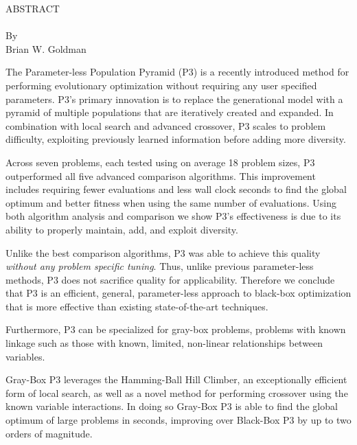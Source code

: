 \thispagestyle{empty} \setcounter{page}{2}
\begin{doublespace}
\begin{centering}
ABSTRACT\\ %
\MyTitle\\ %
By \\ %
Brian W. Goldman\\ %
\end{centering}

The Parameter-less Population Pyramid (P3) is a recently introduced method for performing
evolutionary optimization without requiring any user specified parameters.
P3's primary innovation is to replace the generational model with a pyramid of
multiple populations that are iteratively created and expanded. In combination
with local search and advanced crossover, %
P3 scales to problem difficulty, exploiting
previously learned information before adding more diversity.

Across seven problems, each tested using on average 18 problem sizes, P3 outperformed
all five advanced comparison algorithms. This improvement includes
requiring 
fewer evaluations
and less wall clock seconds to find the global optimum and better fitness when using
the same number of evaluations. Using both algorithm analysis and
comparison we 
show P3's
effectiveness is due to its ability to properly maintain, add, and exploit diversity.

Unlike the best comparison algorithms, P3 was able to achieve this
quality 
\textit{without any
problem specific tuning}. Thus, unlike previous parameter-less methods, P3 does not
sacrifice quality for applicability. Therefore we conclude that
P3 is an efficient, general, parameter-less approach to black-box
optimization that is more effective than existing state-of-the-art techniques.

Furthermore, P3 can be specialized for gray-box problems, problems with known
linkage such as those with known, limited, non-linear relationships
between variables.


Gray-Box P3 leverages the Hamming-Ball Hill Climber, an exceptionally efficient
form of local search, as well as a novel method for performing crossover using the
known variable interactions. In doing so Gray-Box P3 is able to find the global
optimum of large problems in seconds, improving over Black-Box P3 by up to
two orders of magnitude.
\end{doublespace}
\newpage

